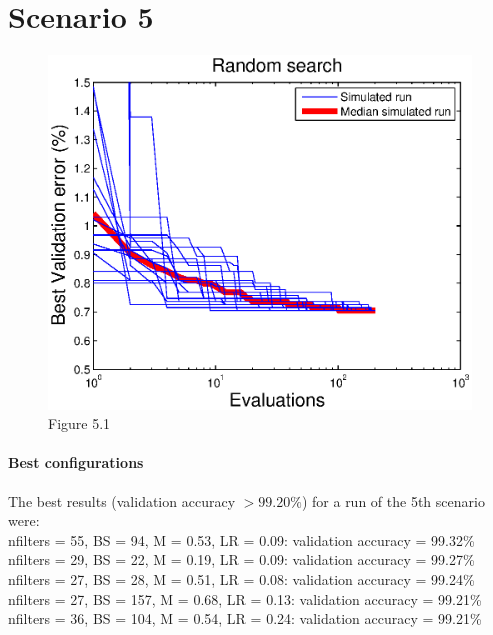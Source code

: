 \documentclass{article}
\begin{document}
    
    
\section*{Scenario 5}
    
    \begin{figure}[!htb]
        \centering
        \includegraphics[width=\textwidth]{figures/sc5}
        \captionsetup{labelformat=empty}
        \caption{Figure 5.1}
    \end{figure}
    
    \paragraph{Best configurations}
        The best results (validation accuracy $> 99.20\%$) for a run of the 5th scenario were:
        \vspace{10px}\\
        nfilters = 55, BS = 94, M = 0.53, LR = 0.09: validation accuracy = 99.32\% \\
        nfilters = 29, BS = 22, M = 0.19, LR = 0.09: validation accuracy = 99.27\% \\
        nfilters = 27, BS = 28,	M = 0.51, LR = 0.08: validation accuracy = 99.24\% \\
        nfilters = 27, BS = 157, M = 0.68, LR = 0.13: validation accuracy = 99.21\% \\
        nfilters = 36, BS = 104, M = 0.54, LR = 0.24: validation accuracy = 99.21\% \\
        
\end{document}
